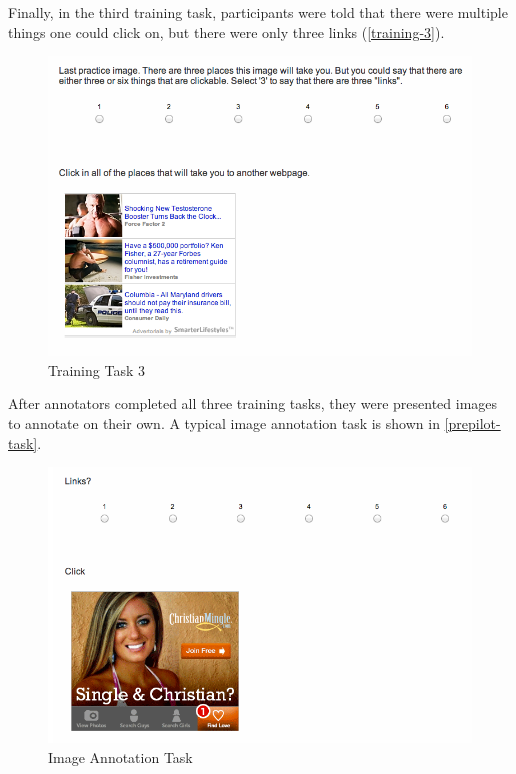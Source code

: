 Finally, in the third training task, participants were told that there were multiple things one could click on, but there were only three links  (\autoref{training-3}). 

\begin{figure}
\centerline{
\includegraphics[scale=.3]{chapter6.tex/training3}
}
\caption{Training Task 3}
\label{training-3}
\end{figure}


After annotators completed all three training tasks, they were presented images to annotate on their own. A typical image annotation task is shown in  \autoref{prepilot-task}. 


\begin{figure}
\centerline{
\includegraphics[scale=.3]{chapter6.tex/example1}
}
\caption{Image Annotation Task}
\label{prepilot-task}
\end{figure}


